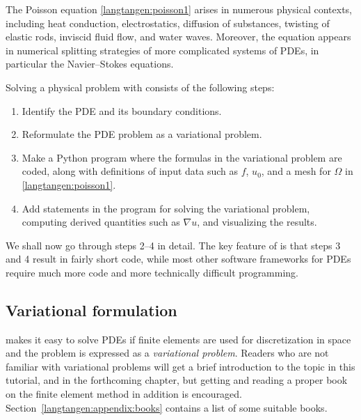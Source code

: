 The Poisson equation \eqref{langtangen:poisson1} arises in numerous
physical contexts, including heat conduction, electrostatics,
diffusion of substances, twisting of elastic rods, inviscid fluid
flow, and water waves. Moreover, the equation appears in numerical
splitting strategies of more complicated systems of PDEs, in
particular the Navier--Stokes equations.

Solving a physical problem with \fenics{} consists of the following
steps:
\begin{enumerate}
\item Identify the PDE and its boundary conditions.
\item Reformulate the PDE problem as a variational problem.
\item Make a Python program where the formulas in the variational
problem are coded, along with definitions of input data such as
$f$, $u_0$, and a mesh for $\Omega$ in \eqref{langtangen:poisson1}.
\item Add statements in the program for solving the variational
  problem, computing derived quantities such as $\nabla u$, and
  visualizing the results.
\end{enumerate}
We shall now go through steps 2--4 in detail.  The key feature of
\fenics{} is that steps 3 and 4 result in fairly short code, while
most other software frameworks for PDEs require much more code and
more technically difficult programming.

\subsection{Variational formulation}
\label{langtangen:poisson1:varform}

\fenics{} makes it easy to solve PDEs if finite elements are used for
discretization in space and the problem is expressed as a
\emph{variational problem}. Readers who are not familiar with
variational problems will get a brief introduction to the topic in
this tutorial, and in the forthcoming chapter, but getting and reading
a proper book on the finite element method in addition is encouraged.
Section~\ref{langtangen:appendix:books} contains a list of some
suitable books.


